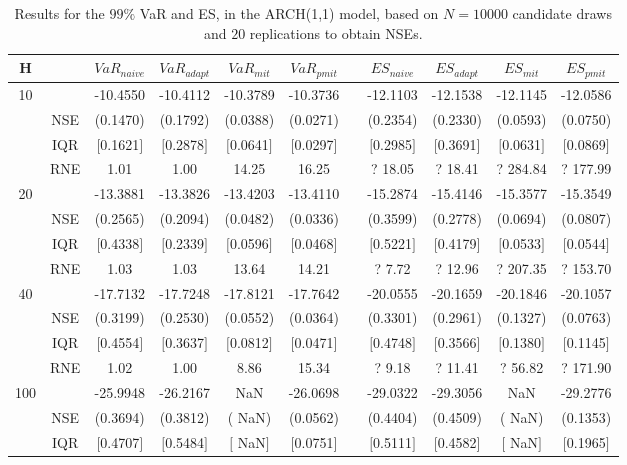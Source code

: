 \begin{table}[h] 
\centering 
\caption{Results for the $99\%$ VaR and ES, in the ARCH(1,1) model, based on $N=10000$ candidate draws and $20$ replications to obtain NSEs.} 
\label{tab:res_algos_arch} 
\begin{tabular}{cc cccc c cccc}  
 H & & $VaR_{naive}$ & $VaR_{adapt}$ & $VaR_{mit}$  & $VaR_{pmit}$ &  & $ES_{naive}$ & $ES_{adapt}$ & $ES_{mit}$ & $ES_{pmit}$ \\ \hline 
10 & & -10.4550 & -10.4112 & -10.3789 & -10.3736 & & -12.1103 & -12.1538 & -12.1145 & -12.0586  \\ 
  & NSE & (0.1470) & (0.1792) & (0.0388) & (0.0271) & & (0.2354) & (0.2330) & (0.0593) & (0.0750)   \\ 
  & IQR & $[$0.1621$]$ & $[$0.2878$]$ & $[$0.0641$]$ & $[$0.0297$]$ & & $[$0.2985$]$ & $[$0.3691$]$ & $[$0.0631$]$ & $[$0.0869$]$  \\  
  & RNE &   1.01 &   1.00 &  14.25 &  16.25 &  &?  18.05 & ?  18.41 & ? 284.84 & ? 177.99   \\ [1ex] 
20 & & -13.3881 & -13.3826 & -13.4203 & -13.4110 & & -15.2874 & -15.4146 & -15.3577 & -15.3549  \\ 
  & NSE & (0.2565) & (0.2094) & (0.0482) & (0.0336) & & (0.3599) & (0.2778) & (0.0694) & (0.0807)   \\ 
  & IQR & $[$0.4338$]$ & $[$0.2339$]$ & $[$0.0596$]$ & $[$0.0468$]$ & & $[$0.5221$]$ & $[$0.4179$]$ & $[$0.0533$]$ & $[$0.0544$]$  \\  
  & RNE &   1.03 &   1.03 &  13.64 &  14.21 &  &?   7.72 & ?  12.96  & ? 207.35 & ? 153.70   \\ [1ex] 
40 & & -17.7132 & -17.7248 & -17.8121 & -17.7642 & & -20.0555 & -20.1659 & -20.1846 & -20.1057  \\ 
  & NSE & (0.3199) & (0.2530) & (0.0552) & (0.0364) & & (0.3301) & (0.2961) & (0.1327) & (0.0763)   \\ 
  & IQR & $[$0.4554$]$ & $[$0.3637$]$ & $[$0.0812$]$ & $[$0.0471$]$ & & $[$0.4748$]$ & $[$0.3566$]$ & $[$0.1380$]$ & $[$0.1145$]$  \\  
  & RNE &   1.02 &   1.00 &   8.86 &  15.34 &  &?   9.18 & ?  11.41 & ?  56.82 & ? 171.90   \\ [1ex] 
100 & & -25.9948 & -26.2167 &    NaN & -26.0698 & & -29.0322 & -29.3056 &    NaN & -29.2776  \\ 
  & NSE & (0.3694) & (0.3812) & (   NaN) & (0.0562) & & (0.4404) & (0.4509) & (   NaN) & (0.1353)   \\ 
  & IQR & $[$0.4707$]$ & $[$0.5484$]$ & $[$   NaN$]$ & $[$0.0751$]$ & & $[$0.5111$]$ & $[$0.4582$]$ & $[$   NaN$]$ & $[$0.1965$]$  \\  

\end{tabular}
\end{table}
